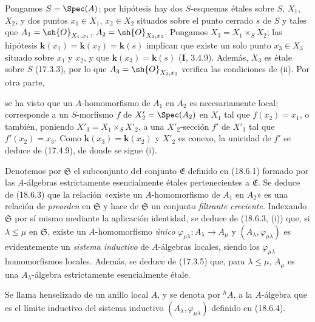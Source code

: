 Pongamos $S=\Spec(A)$; por hipótesis hay dos $S$-esquemas étales sobre $S$, $X_1$, $X_2$, y dos puntos $x_1\in X_1$, $x_2\in X_2$ situados sobre el punto cerrado $s$ de $S$ y tales que $A_1=\sh{O}_{X_1,x_1}$, $A_2=\sh{O}_{X_2,x_2}$. Pongamos $X_3=X_1\times_S X_2$; las hipótesis $\boldsymbol k(x_1)=\boldsymbol k(x_2)=\boldsymbol k(s)$ implican que existe un solo punto $x_3\in X_3$ situado sobre $x_1$ y $x_2$, y que $\boldsymbol k(x_3)=\boldsymbol k(s)$ (\textbf I, 3.4.9). Además, $X_3$ es étale sobre $S$ (17.3.3), por lo que $A_3=\sh{O}_{X_3,x_3}$ verifica las condiciones de (ii). Por otra parte,


se ha visto que un $A$-homomorfismo de $A_1$ en $A_2$ es necesariamente local; corresponde a un $S$-morfismo $f$ de $X'_2=\Spec(A_2)$ en $X_1$ tal que $f(x_2)=x_1$, o también, poniendo $X'_3=X_1\times_S X'_2$, a una $X'_2$-sección $f'$ de $X'_3$ tal que $f'(x_2)=x_3$. Como $\boldsymbol k(x_3)=\boldsymbol k(x_2)$ y $X'_2$ es conexo, la unicidad de $f'$ se deduce de (17.4.9), de donde se sigue (i).

\begin{env}[18.6.4]
\label{IV.18.6.4}
Denotemos por $\mathfrak S$ el subconjunto del conjunto $\mathfrak E$ definido en (18.6.1) formado por las $A$-álgebras estrictamente esencialmente étales pertenecientes a $\mathfrak E$. Se deduce de (18.6.3) que la relación «existe un $A$-homomorfismo de $A_1$ en $A_2$» es una relación de \emph{preorden} en $\mathfrak S$ y hace de $\mathfrak S$ un conjunto \emph{filtrante creciente}. Indexando $\mathfrak S$ por sí mismo mediante la aplicación identidad, se deduce de (18.6.3, (i)) que, si $\lambda\leq\mu$ en $\mathfrak S$, existe un $A$-homomorfismo \emph{único} $\varphi_{\mu\lambda}:A_\lambda\to A_\mu$ y $(A_\lambda,\varphi_{\mu\lambda})$ es evidentemente un \emph{sistema inductivo} de $A$-álgebras locales, siendo los $\varphi_{\mu\lambda}$ homomorfismos locales. Además, se deduce de (17.3.5) que, para $\lambda\leq\mu$, $A_\mu$ es una $A_\lambda$-álgebra estrictamente esencialmente étale.
\end{env}

\begin{definition}[18.6.5]
\label{IV.18.6.5}
Se llama henselizado de un anillo local $A$, y se denota por ${}^h\!A$, a la $A$-álgebra que es el límite inductivo del sistema inductivo $(A_\lambda,\varphi_{\mu\lambda})$ definido en \textup{(18.6.4)}.
\end{definition}


